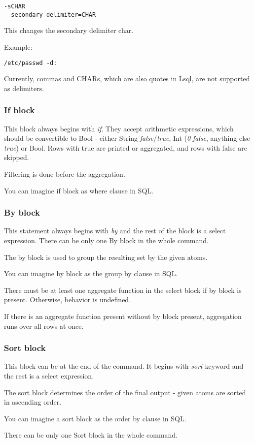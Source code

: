 \begin{verbatim}
-sCHAR
--secondary-delimiter=CHAR
\end{verbatim}
This changes the secondary delimiter char.

Example:
\begin{verbatim}
/etc/passwd -d:
\end{verbatim}

Currently, commas and CHARs, which are also quotes in Lsql, are not supported as delimiters.

\subsubsection{If block}
This block always begins with \textit{if}. They accept arithmetic expressions, which should be convertible to Bool - either String \textit{false}/\textit{true}, Int (\textit{0} \textit{false}, anything else \textit{true}) or Bool. 
Rows with true are printed or aggregated, and rows with false are skipped.

Filtering is done before the aggregation.

You can imagine if block as where clause in SQL.

\subsubsection{By block}
This statement always begins with \textit{by} and the rest of the block is a select expression. There can be only one By block in the whole command.

The by block is used to group the resulting set by the given atoms.

You can imagine by block as the group by clause in SQL. 

There must be at least one aggregate function in the select block if by block is present. Otherwise, behavior is undefined.

If there is an aggregate function present without by block present, aggregation runs over all rows at once.

\subsubsection{Sort block}
This block can be at the end of the command. It begins with \textit{sort} keyword and the rest is a select expression.

The sort block determines the order of the final output - given atoms are sorted in ascending order.

You can imagine a sort block as the order by clause in SQL.

There can be only one Sort block in the whole command.

